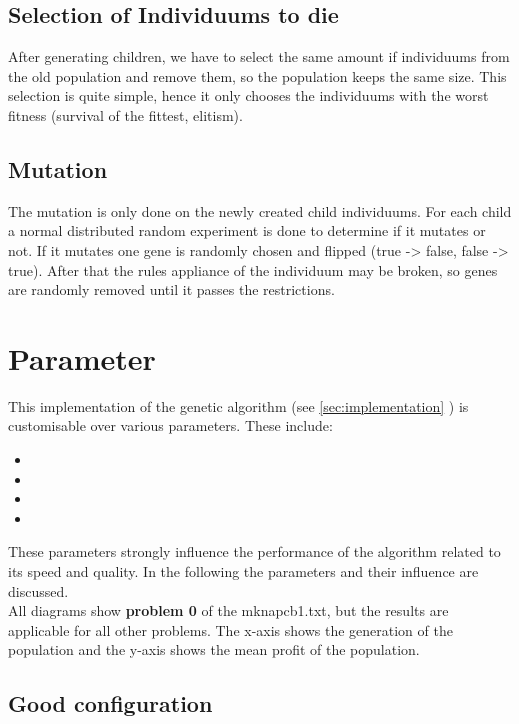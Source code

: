 \documentclass[fontsize=12pt,toc=bibliography, notitlepage]{scrreprt}
\newcommand{\refnn}[1]{\ref{#1} \nameref{#1}}
\begin{document}
\subsection{Selection of Individuums to die}
\label{subsec:selection-of-individuums-to-die}
After generating children, we have to select the same amount if individuums from the old population and remove them, so the population keeps the same size. This selection is quite simple, hence it only chooses the individuums with the worst fitness (survival of the fittest, elitism).

\subsection{Mutation}
\label{subsec:mutation}
The mutation is only done on the newly created child individuums. For each child a normal distributed random experiment is done to determine if it mutates or not. If it mutates one gene is randomly chosen and flipped (true -> false, false -> true). After that the rules appliance of the individuum may be broken, so genes are randomly removed until it passes the restrictions. 

\section{Parameter}
\label{sec:parameter}
This implementation of the genetic algorithm (see \refnn{sec:implementation}) is customisable over various parameters. These include:
\begin{itemize}
	\item {}
	\item {}
	\item {}
	\item {}
\end{itemize}
These parameters strongly influence the performance of the algorithm related to its speed and quality. In the following the parameters and their influence are discussed.\\
All diagrams show \textbf{problem 0} of the mknapcb1.txt, but the results are applicable for all other problems. The x-axis shows the generation of the population and the y-axis shows the mean profit of the population.

\subsection{Good configuration}
\label{subsec:good-config}
\end{document}

